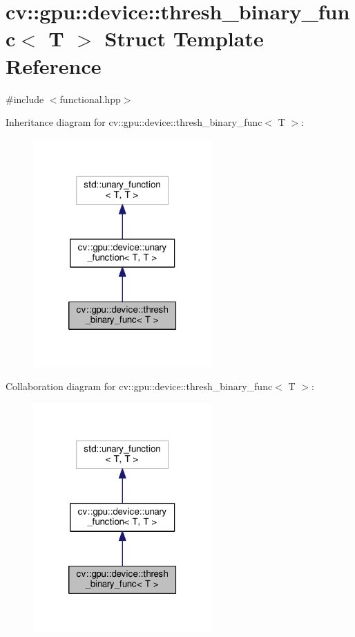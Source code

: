 \hypertarget{structcv_1_1gpu_1_1device_1_1thresh__binary__func}{\section{cv\-:\-:gpu\-:\-:device\-:\-:thresh\-\_\-binary\-\_\-func$<$ T $>$ Struct Template Reference}
\label{structcv_1_1gpu_1_1device_1_1thresh__binary__func}
}


{\ttfamily \#include $<$functional.\-hpp$>$}



Inheritance diagram for cv\-:\-:gpu\-:\-:device\-:\-:thresh\-\_\-binary\-\_\-func$<$ T $>$\-:\nopagebreak
\begin{figure}[H]
\begin{center}
\leavevmode
\includegraphics[width=194pt]{structcv_1_1gpu_1_1device_1_1thresh__binary__func__inherit__graph}
\end{center}
\end{figure}


Collaboration diagram for cv\-:\-:gpu\-:\-:device\-:\-:thresh\-\_\-binary\-\_\-func$<$ T $>$\-:\nopagebreak
\begin{figure}[H]
\begin{center}
\leavevmode
\includegraphics[width=194pt]{structcv_1_1gpu_1_1device_1_1thresh__binary__func__coll__graph}
\end{center}
\end{figure}
